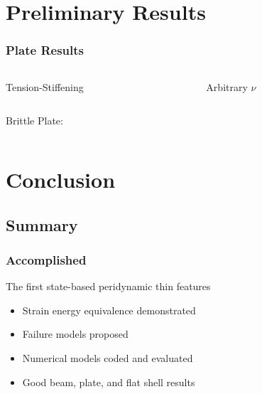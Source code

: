 \documentclass{beamer}
\newcommand{\plotpath}{./plots}
\begin{document}
\section{Preliminary Results}
%
%
\begin{frame}
  \frametitle{Plate Results}
     \begin{columns}[T] %
     \begin{column}[T]{5cm} %
 	 \centering
	Tension-Stiffening
	\resizebox{\linewidth}{!}{}
     \end{column}
     \begin{column}[T]{5cm} %
	\centering
	Arbitrary $\nu$
	\resizebox{\linewidth}{!}{}
     \end{column}
     \end{columns}
\end{frame}
%
%
\begin{frame}
     \begin{columns}[C] %
     \begin{column}[C]{3cm} %
 	 \centering
	Brittle Plate:
     \end{column}
     \begin{column}[C]{6cm} %
	\centering
	\resizebox{\linewidth}{!}{}
     
     \end{column}
     \end{columns}
\end{frame}
%
%

\section{Conclusion}
%
\subsection{Summary}
%
\begin{frame}
\frametitle{Accomplished}
  The first state-based peridynamic thin features
  \begin{itemize}
    \item Strain energy equivalence demonstrated
    \item Failure models proposed
    \item Numerical models coded and evaluated
    \item Good beam, plate, and flat shell results
  \end{itemize}

\end{frame}
%
\end{document}
